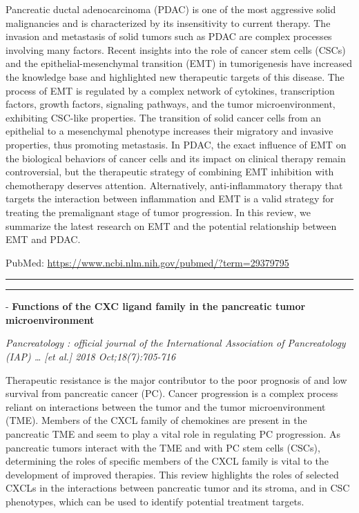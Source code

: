 \documentclass[]{article}
\begin{document}
Pancreatic ductal adenocarcinoma (PDAC) is one of the most aggressive
solid malignancies and is characterized by its insensitivity to current
therapy. The invasion and metastasis of solid tumors such as PDAC are
complex processes involving many factors. Recent insights into the role
of cancer stem cells (CSCs) and the epithelial-mesenchymal transition
(EMT) in tumorigenesis have increased the knowledge base and highlighted
new therapeutic targets of this disease. The process of EMT is regulated
by a complex network of cytokines, transcription factors, growth
factors, signaling pathways, and the tumor microenvironment, exhibiting
CSC-like properties. The transition of solid cancer cells from an
epithelial to a mesenchymal phenotype increases their migratory and
invasive properties, thus promoting metastasis. In PDAC, the exact
influence of EMT on the biological behaviors of cancer cells and its
impact on clinical therapy remain controversial, but the therapeutic
strategy of combining EMT inhibition with chemotherapy deserves
attention. Alternatively, anti-inflammatory therapy that targets the
interaction between inflammation and EMT is a valid strategy for
treating the premalignant stage of tumor progression. In this review, we
summarize the latest research on EMT and the potential relationship
between EMT and PDAC.

PubMed: \url{https://www.ncbi.nlm.nih.gov/pubmed/?term=29379795}

{}

{}

\begin{center}\rule{0.5\linewidth}{\linethickness}\end{center}

\begin{center}\rule{0.5\linewidth}{\linethickness}\end{center}

 - \textbf{Functions of the CXC ligand family in the pancreatic tumor
microenvironment}

\emph{Pancreatology : official journal of the International Association
of Pancreatology (IAP) \ldots{} {[}et al.{]} 2018 Oct;18(7):705-716}

Therapeutic resistance is the major contributor to the poor prognosis of
and low survival from pancreatic cancer (PC). Cancer progression is a
complex process reliant on interactions between the tumor and the tumor
microenvironment (TME). Members of the CXCL family of chemokines are
present in the pancreatic TME and seem to play a vital role in
regulating PC progression. As pancreatic tumors interact with the TME
and with PC stem cells (CSCs), determining the roles of specific members
of the CXCL family is vital to the development of improved therapies.
This review highlights the roles of selected CXCLs in the interactions
between pancreatic tumor and its stroma, and in CSC phenotypes, which
can be used to identify potential treatment targets.
\end{document}
